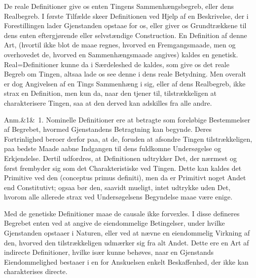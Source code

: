 \documentclass[12pt]{book}
\makeatletter
\def\sperr#1{#1}%
\def\textit#1{#1}%
\def\emph#1{#1}%
\newcommand{\sperr}[1]{\textls[180]{#1}}
\newcommand{\umph}[2][misc]{%
  \@ifundefined{umph@#1@on}{#2}{\emph{#2}}}
\newcommand{\anm}[1]{%
  \par\vspace{0.5\baselineskip}%
  \noindent\hspace{\parindent}\sperr{Anm.}\ifx&#1&\else~\textit{#1}.\fi
  \enspace\ignorespaces
}
\newcommand{\opage}[1]{\marginnote{\footnotesize\textit{[#1]}}}
\makeatother
\begin{document}
De reale Definitioner give os enten Tingens \emph{Sammenhængsbegreb}, eller
dens \emph{Realbegreb}. I første Tilfælde skeer Definitionen ved Hjelp af en
\umph[schwab]{intellectuel} Beskrivelse, der i Forestillingen lader
Gjenstanden opstaae for os, eller giver os Grundtrækkene til dens enten
eftergjørende eller selvstændige Construction. En Definition af denne Art,
(hvortil ikke blot de maae regnes, hvorved en Fremgangsmaade, men og
overhovedet de, hvorved en Sammenhængsmaade angives) kaldes en
\emph{genetisk}. Real=Definitioner kunne da i Særdeleshed de kaldes, som give
os det reale Begreb om Tingen, altsaa lade os see denne i dens reale
Betydning. Men overalt er dog Angivelsen af en Tings Sammenhæng i sig, eller
af dens Realbegreb, ikke strax en Definition, men kun da, naar den tjener
til, tilstrækkeligen at charakterisere Tingen, saa at den derved kan
adskilles fra alle andre.
\opage{373} \anm{1} \emph{Nominelle} Definitioner ere at betragte som foreløbige
Bestemmelser af Begrebet, hvormed Gjenstandens Betragtning kan begynde.
Deres Fortrinlighed beroer derfor paa, at de, foruden at afsondre Tingen
tilstrækkeligen, paa bedste Maade aabne Indgangen til dens fuldkomne
Undersøgelse og Erkjendelse. Dertil udfordres, at Definitionen udtrykker
Det, der nærmest og først frembyder sig som det Charakteristiske ved Tingen.
Dette kan kaldes det Primitive ved den
(\textit{conceptus primus definiti}), men da er Primitivt noget Andet end
Constitutivt; ogsaa bør den, saavidt mueligt, intet udtrykke uden Det,
hvorom alle allerede strax ved Undersøgelsens Begyndelse maae være enige.

Med de \emph{genetiske} Definitioner maae de \emph{causale} ikke forvexles.
I disse defineres Begrebet enten ved at angive de eiendommelige Betingelser,
under hvilke Gjenstanden opstaaer i Naturen, eller ved at nævne en
eiendommelig Virkning af den, hvorved den tilstrækkeligen udmærker sig fra
alt Andet. Dette ere en Art af \emph{indirecte} Definitioner, hvilke især
kunne behøves, naar en Gjenstands Eiendommelighed bestaaer i en for
Anskuelsen enkelt Beskaffenhed, der ikke kan charakterises \emph{directe}.
\end{document}
